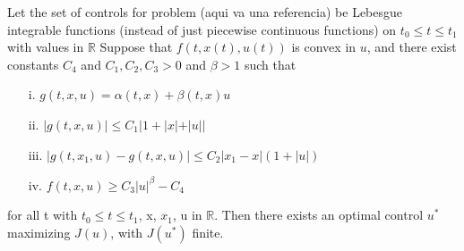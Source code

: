 \begin{theorem}
	Let the set of controls for problem (aqui va una referencia) be Lebesgue
    integrable functions (instead of just piecewise continuous functions) on
    $t_0 \leq t \leq t_1$ with values in $\mathbb{R}$ Suppose that 
    $f(t,x(t),u(t))$ is convex in $u$, and there exist constants $C_4$ and
    $C_1, C_2, C_3 > 0$ and $\beta > 1$ such that
    \begin{enumerate}
    	\item[i.]
        	$g(t,x,u) = \alpha (t,x) + \beta (t,x)u$
        \item[ii.]
        	$|g(t,x,u)| \leq C_1 |1 + |x| + |u||$
        \item[iii.]
        	$|g(t,x_1,u) - g(t,x,u)| \leq C_2 |x_1 - x|(1 + |u|)$
        \item[iv.]
        	$f(t,x,u) \geq C_3 |u|^{\beta} - C_4$
    \end{enumerate}
	for all t with $t_0 \leq t \leq t_1$, x, $x_1$, u in $\mathbb{R}$. Then 
    there exists an optimal control $u^{*}$ maximizing $J(u)$, with $J(u^{*})$
    finite.
\end{theorem}
